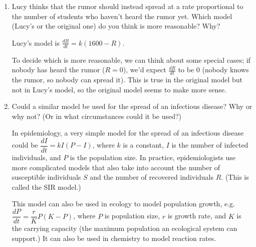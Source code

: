 \documentclass[main]{subfiles}
\begin{document}
\begin{enumerate}[resume]
\begin{enumerate}
  \item
    \begin{problem}[\vfill]
      Lucy thinks that the rumor should instead spread at a rate
      proportional to the number of students who haven't heard the rumor
      yet.  Which model (Lucy's or the original one) do you think is more
      reasonable?  Why?
    \end{problem}

    \begin{solution}
      Lucy's model is $\frac{dR}{dt} =k(1600-R)$.

      To decide which is more reasonable, we can think about some special
      cases; if nobody has heard the rumor ($R = 0$), we'd expect
      $\frac{dR}{dt}$ to be 0 (nobody knows the rumor, so nobody can
      spread it).  This is true in the original model but not in Lucy's
      model, so the original model seems to make more sense. 
    \end{solution}

    \item
    \begin{problem}[\vfill]
        Could a similar model be used for the spread of an infectious disease?
        Why or why not? (Or in what circumstances could it be used?)
    \end{problem}

    \begin{solution}
        In epidemiology, a very simple model for the spread of an infectious
        disease could be $\dfrac{dI}{dt}=kI(P-I)$, where $k$ is a constant, $I$
        is the number of infected individuals, and $P$ is the population size.
        In practice, epidemiologists use more complicated models that also take
        into account the number of susceptible individuals $S$ and the number
        of recovered individuals $R$. (This is called the SIR model.)

        This model can also be used in ecology to model population growth, e.g.
        $\dfrac{dP}{dt}=\dfrac{r}{K}P(K-P)$, where $P$ is population size,
        $r$ is growth rate, and $K$ is the carrying capacity (the maximum
        population an ecological system can support.) It can also be used
        in chemistry to model reaction rates.
    \end{solution}

  \end{enumerate}

\end{enumerate}
\end{document}
